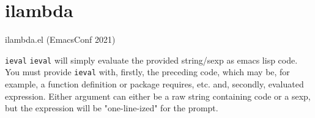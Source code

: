 \documentclass[presentation]{beamer}
\begin{document}
\section{ilambda}
\label{sec:org3ad939e}
\begin{frame}[label={sec:orgeaa9f1a},fragile]{ilambda.el (EmacsConf 2021)}
 \begin{block}{\texttt{ieval}}
\texttt{ieval} will simply evaluate the provided
string/sexp as emacs lisp code. You
must provide \texttt{ieval} with, firstly, the preceding
code, which may be, for example, a function
definition or package requires, etc. and,
secondly, evaluated expression. Either
argument can either be a raw string containing
code or a sexp, but the expression will be
"one-line-ized" for the prompt.
\end{block}
\end{frame}
\end{document}
